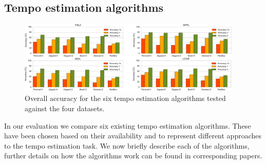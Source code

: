 \documentclass{article}
\begin{document}
\subsection{Tempo estimation algorithms}\label{sec:algorithms}

\begin{figure} 
 \centerline{
 \includegraphics[width=0.95\textwidth]{figs/overall_accuracies-crop.pdf}}
 \caption{Overall accuracy for the six tempo estimation algorithms tested against the four datasets.}
 \label{fig:overall_accuracies}
\end{figure}

In our evaluation we compare six existing tempo estimation algorithms.
These have been chosen based on their availability and to represent different approaches to the tempo estimation task.
We now briefly describe each of the algorithms, further details on how the algorithms work can be found in corresponding papers.
\end{document}
